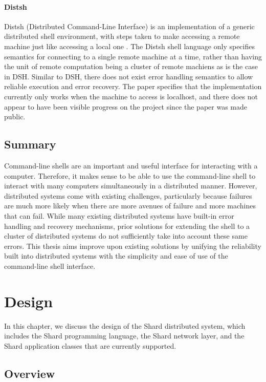 \documentclass[twoside]{report}
\begin{document}
\subsubsection{Distsh}
Distsh (Distributed Command-Line Interface) is an implementation of a generic distributed shell environment, with steps taken to make accessing a remote machine just like accessing a local one \cite{distsh}.
The Distsh shell language only specifies semantics for connecting to a single remote machine at a time, rather than having the unit of remote computation being a cluster of remote machiens as is the case in DSH.
Similar to DSH, there does not exist error handling semantics to allow reliable execution and error recovery.
The paper specifies that the implementation currently only works when the machine to access is localhost, and there does not appear to have been visible progress on the project since the paper was made public.

\section{Summary}
Command-line shells are an important and useful interface for interacting with a computer.
Therefore, it makes sense to be able to use the command-line shell to interact with many computers simultaneously in a distributed manner.
However, distributed systems come with existing challenges, particularly because failures are much more likely when there are more avenues of failure and more machines that can fail.
While many existing distributed systems have built-in error handling and recovery mechanisms, prior solutions for extending the shell to a cluster of distributed systems do not sufficiently take into account these same errors.
This thesis aims improve upon existing solutions by unifying the reliability built into distributed systems with the simplicity and ease of use of the command-line shell interface.

\chapter{Design}

In this chapter, we discuss the design of the Shard distributed system, which includes the Shard programming language, the Shard network layer, and the Shard application classes that are currently supported.

\section{Overview}
\end{document}
